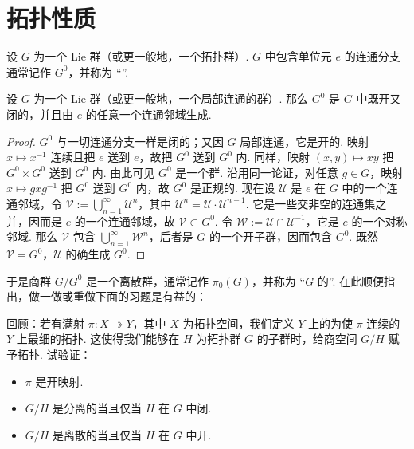 \section{拓扑性质}\label{sec:lie-1-3}
\begin{numpara}[单位元分支]\label{np:lie-1-3-1}
设 $G$ 为一个 Lie 群（或更一般地，一个拓扑群）. $G$ 中包含单位元 $e$ 的连通分支通常记作 $G^0$，并称为 ``''.
\end{numpara}
\begin{proposition*}
设 $G$ 为一个 Lie 群（或更一般地，一个局部连通的群）. 那么 $G^0$ 是 $G$ 中既开又闭的，并且由 $e$ 的任意一个连通邻域生成.
\end{proposition*}
\begin{proof}
$G^0$ 与一切连通分支一样是闭的；又因 $G$ 局部连通，它是开的. 映射 $x\mapsto x^{-1}$ 连续且把 $e$ 送到 $e$，故把 $G^0$ 送到 $G^0$ 内. 同样，映射 $(x,y)\mapsto xy$ 把 $G^0\times G^0$ 送到 $G^0$ 内. 由此可见 $G^0$ 是一个群. 沿用同一论证，对任意 $g\in G$，映射 $x\mapsto gxg^{-1}$ 把 $G^0$ 送到 $G^0$ 内，故 $G^0$ 是正规的.
现在设 $\mathcal U$ 是 $e$ 在 $G$ 中的一个连通邻域，令 $\mathcal V:=\bigcup_{n=1}^{\infty}\mathcal U^n$，其中 $\mathcal U^n=\mathcal U\cdot\mathcal U^{n-1}$. 它是一些交非空的连通集之并，因而是 $e$ 的一个连通邻域，故 $\mathcal V\subset G^0$. 令 $\mathcal W:=\mathcal U\cap\mathcal U^{-1}$，它是 $e$ 的一个对称邻域. 那么 $\mathcal V$ 包含 $\bigcup_{n=1}^{\infty}\mathcal W^n$，后者是 $G$ 的一个开子群，因而包含 $G^0$. 既然 $\mathcal V=G^0$，$\mathcal U$ 的确生成 $G^0$.
\end{proof}
于是商群 $G/G^0$ 是一个离散群，通常记作 $\pi_0(G)$，并称为 ``$G$ 的''.
在此顺便指出，做一做或重做下面的习题是有益的：
\begin{exercise*}
回顾：若有满射 $\pi:X\twoheadrightarrow Y$，其中 $X$ 为拓扑空间，我们定义 $Y$ 上的为使 $\pi$ 连续的 $Y$ 上最细的拓扑. 这使得我们能够在 $H$ 为拓扑群 $G$ 的子群时，给商空间 $G/H$ 赋予拓扑. 试验证：
\begin{itemize}[label=--]
\item $\pi$ 是开映射.
\item $G/H$ 是分离的当且仅当 $H$ 在 $G$ 中闭.
\item $G/H$ 是离散的当且仅当 $H$ 在 $G$ 中开.
\end{itemize}
\end{exercise*}
